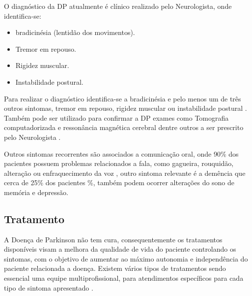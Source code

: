 O diagnóstico da DP atualmente é clínico realizado pelo Neurologista, onde identifica-se:
\begin{itemize}
    \item bradicinésia (lentidão dos movimentos).
    \item Tremor em repouso.
    \item Rigidez muscular.
    \item Instabilidade postural.
\end{itemize}

Para realizar o diagnóstico identifica-se a bradicinésia e pelo menos um de três outros sintomas, tremor em repouso, rigidez muscular ou instabilidade postural \cite{gago2014manual}. Também pode ser utilizado para confirmar a DP exames como Tomografia computadorizada e ressonância magnética cerebral dentre outros a ser prescrito pelo Neurologista \cite{gago2014manual}.

Outros sintomas recorrentes são associados a comunicação oral, onde 90\% dos pacientes possuem problemas relacionados a fala, como gagueira, rouquidão, alteração ou enfraquecimento da voz \cite{zarzur2010laryngeal}, outro sintoma relevante é a demência que cerca de 25\% dos pacientes \cite{pamplona1996demencia}\%, também podem ocorrer alterações do sono de memória e depressão\cite{barbosa2005parkinsons}.

\subsection{Tratamento}
A Doença de Parkinson não tem cura, consequentemente os tratamentos disponíveis visam a melhora da qualidade de vida do paciente controlando os sintomas, com o objetivo de aumentar ao máximo autonomia e independência do paciente relacionada a doença. Existem vários tipos de tratamentos sendo essencial uma equipe multiprofissional, para atendimentos específicos para cada tipo de sintoma apresentado \cite{saito2011doencca}.

